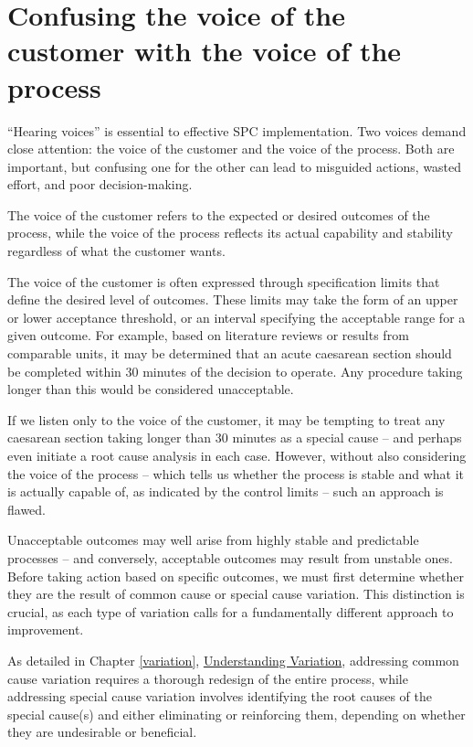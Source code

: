 \documentclass[
]{book}
\begin{document}
\section{Confusing the voice of the customer with the voice of the process}\label{confusing-the-voice-of-the-customer-with-the-voice-of-the-process}

``Hearing voices'' is essential to effective SPC implementation. Two voices demand close attention: the voice of the customer and the voice of the process. Both are important, but confusing one for the other can lead to misguided actions, wasted effort, and poor decision-making.

The voice of the customer refers to the expected or desired outcomes of the process, while the voice of the process reflects its actual capability and stability regardless of what the customer wants.

The voice of the customer is often expressed through specification limits that define the desired level of outcomes. These limits may take the form of an upper or lower acceptance threshold, or an interval specifying the acceptable range for a given outcome. For example, based on literature reviews or results from comparable units, it may be determined that an acute caesarean section should be completed within 30 minutes of the decision to operate. Any procedure taking longer than this would be considered unacceptable.

If we listen only to the voice of the customer, it may be tempting to treat any caesarean section taking longer than 30 minutes as a special cause -- and perhaps even initiate a root cause analysis in each case. However, without also considering the voice of the process -- which tells us whether the process is stable and what it is actually capable of, as indicated by the control limits -- such an approach is flawed.

Unacceptable outcomes may well arise from highly stable and predictable processes -- and conversely, acceptable outcomes may result from unstable ones. Before taking action based on specific outcomes, we must first determine whether they are the result of common cause or special cause variation. This distinction is crucial, as each type of variation calls for a fundamentally different approach to improvement.

As detailed in Chapter \ref{variation}, \hyperref[variation]{Understanding Variation}, addressing common cause variation requires a thorough redesign of the entire process, while addressing special cause variation involves identifying the root causes of the special cause(s) and either eliminating or reinforcing them, depending on whether they are undesirable or beneficial.
\end{document}
